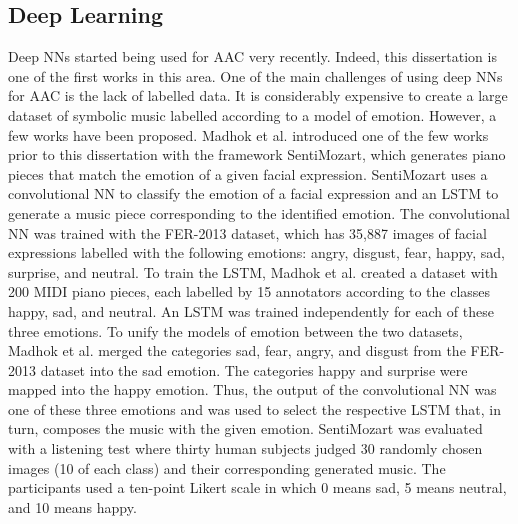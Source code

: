 
\subsection{Deep Learning}

Deep NNs started being used for AAC very recently. Indeed, this dissertation is one of the first works in this area. One of the main challenges of using deep NNs for AAC is the lack of labelled data. It is considerably expensive to create a large dataset of symbolic music labelled according to a model of emotion. However, a few works have been proposed. Madhok et al. \cite{madhok2018sentimozart} introduced one of the few works prior to this dissertation with the framework SentiMozart, which generates piano pieces that match the emotion of a given facial expression. SentiMozart uses a convolutional NN to classify the emotion of a facial expression and an LSTM to generate a music piece corresponding to the identified emotion. The convolutional NN was trained with the FER-2013 \cite{goodfellow2013challenges} dataset, which has 35,887 images of facial expressions labelled with the following emotions: angry, disgust, fear, happy, sad, surprise, and neutral. To train the LSTM, Madhok et al. \cite{madhok2018sentimozart} created a dataset with 200 MIDI piano pieces, each labelled by 15 annotators according to the classes happy, sad, and neutral. An LSTM was trained independently for each of these three emotions. To unify the models of emotion between the two datasets, Madhok et al.\cite{madhok2018sentimozart} merged the categories sad, fear, angry, and disgust from the FER-2013 dataset into the sad emotion. The categories happy and surprise were mapped into the happy emotion. Thus, the output of the convolutional NN was one of these three emotions and was used to select the respective LSTM that, in turn, composes the music with the given emotion. SentiMozart was evaluated with a listening test where thirty human subjects judged 30 randomly chosen images (10 of each class) and their corresponding generated music. The participants used a ten-point Likert scale in which 0 means sad, 5 means neutral, and 10 means happy.


